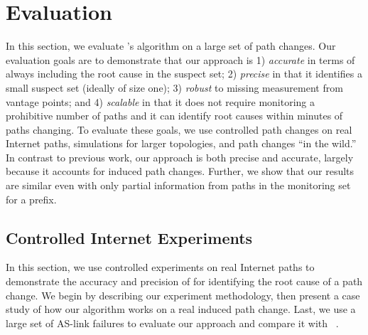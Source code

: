 \section{Evaluation}
\label{sec:eval}

In this section, we evaluate \ouralgo's algorithm on a large set of path
changes. Our evaluation goals are to demonstrate that our approach is 1)
\emph{accurate} in terms of always including the root cause in the
suspect set; 2) \emph{precise} in that it identifies a small suspect set
(ideally of size one); 3) \emph{robust} to missing measurement from
vantage points; and 4) \emph{scalable} in that it does not require
monitoring a prohibitive number of paths and it can identify root causes
within minutes of paths changing. To evaluate these goals, we use
controlled path changes on real Internet paths, simulations for larger
topologies, and path changes ``in the wild.'' In contrast to previous
work, our approach is both precise and accurate, largely because it
accounts for induced path changes. Further, we show that our results are
similar even with only partial information from paths in the monitoring
set for a prefix.


\subsection{Controlled Internet Experiments}

In this section, we use controlled experiments on real Internet paths to demonstrate the accuracy and  
precision of \ouralgo for identifying the root cause of a path change. We begin 
by describing our experiment methodology, then present a case study of how our algorithm works on a real 
induced path change. Last, we use a large set of AS-link failures to
evaluate our approach and compare it with \feldmann~\cite{feldman}.

